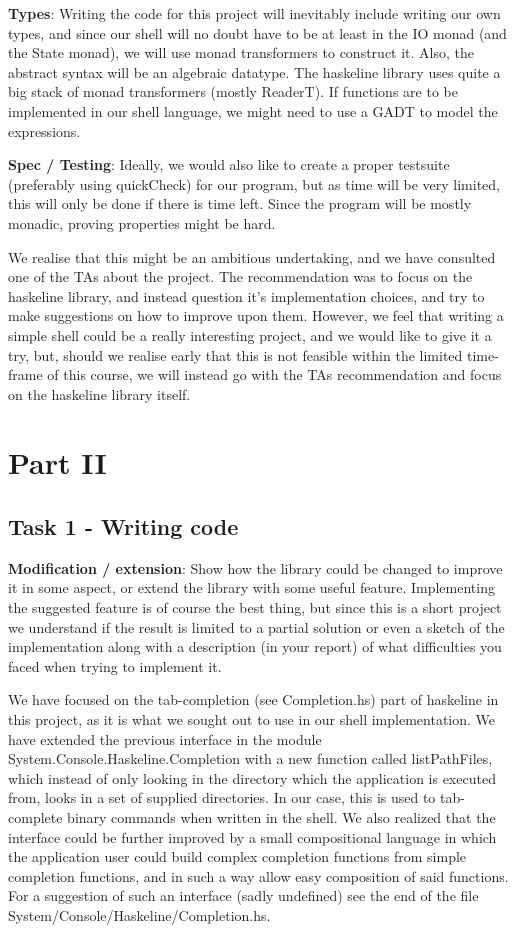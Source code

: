 \documentclass[11pt,a4paper]{article}
\begin{document}
\textbf{Types}: Writing the code for this project will inevitably include writing our own
types, and since our shell will no doubt have to be at least in the IO monad
(and the State monad), we will use monad transformers to construct it. Also, the
abstract syntax will be an algebraic datatype.  The haskeline library uses quite
a big stack of monad transformers (mostly ReaderT). If functions are to be
implemented in our shell language, we might need to use a GADT to model the
expressions.

\textbf{Spec / Testing}: Ideally, we would also like to create  a proper testsuite
(preferably using quickCheck) for our program, but as time will be very limited,
this will only be done if there is time left. Since the program will be mostly
monadic, proving properties might be hard.

We realise that this might be an ambitious undertaking, and we have consulted
one of the TAs about the project. The recommendation was to focus on the
haskeline library, and instead question it’s implementation choices, and try to
make suggestions on how to improve upon them. However, we feel that writing a
simple shell could be a really interesting project, and we would like to give it
a try, but, should we realise early that this is not feasible within the limited
time-frame of this course, we will instead go with the TAs recommendation and
focus on the haskeline library itself.

\section{Part II}

\subsection{Task 1 - Writing code}
\textbf{Modification / extension}: Show how the library could be changed to improve it in
some aspect, or extend the library with some useful feature. Implementing the
suggested feature is of course the best thing, but since this is a short project
we understand if the result is limited to a partial solution or even a sketch of
the implementation along with a description (in your report) of what
difficulties you faced when trying to implement it.

We have focused on the tab-completion (see Completion.hs) part of haskeline in
this project, as it is what we sought out to use in our shell implementation. We
have extended the previous interface in the module
System.Console.Haskeline.Completion with a new function called listPathFiles,
which instead of only looking in the directory which the application is executed
from, looks in a set of supplied directories. In our case, this is used to
tab-complete binary commands when written in the shell. We also realized that
the interface could be further improved by a small compositional language in
which the application user could build complex completion functions from simple
completion functions, and in such a way allow easy composition of said
functions. For a suggestion of such an interface (sadly undefined) see the end
of the file System/Console/Haskeline/Completion.hs.
\end{document}
